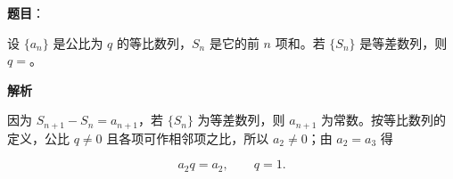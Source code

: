 \begin{answer}

\textbf{题目}：

设 $\{a_n\}$ 是公比为 $q$ 的等比数列，$S_n$ 是它的前 $n$ 项和。若 $\{S_n\}$ 是等差数列，则 $q=$\gkblank{}。

\textbf{解析}

因为 $S_{n+1}-S_n=a_{n+1}$，若 $\{S_n\}$ 为等差数列，则 $a_{n+1}$ 为常数。按等比数列的定义，公比 $q\ne0$ 且各项可作相邻项之比，所以 $a_2\ne0$；由 $a_2=a_3$ 得

\nopagebreak[4]
\[
a_2q=a_2,\qquad q=1.
\]


\end{answer}

